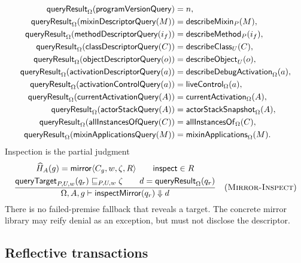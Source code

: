 \begin{equation}\label{eq:mirror-query-result}
\begin{aligned}
 \mathsf{queryResult}_{\Omega}(\mathsf{programVersionQuery})&=n,\\
 \mathsf{queryResult}_{\Omega}(\mathsf{mixinDescriptorQuery}(M))
   &=\mathsf{describeMixin}_{P}(M),\\
 \mathsf{queryResult}_{\Omega}(\mathsf{methodDescriptorQuery}(i_f))
   &=\mathsf{describeMethod}_{P}(i_f),\\
 \mathsf{queryResult}_{\Omega}(\mathsf{classDescriptorQuery}(C))
   &=\mathsf{describeClass}_{U}(C),\\
 \mathsf{queryResult}_{\Omega}(\mathsf{objectDescriptorQuery}(o))
   &=\mathsf{describeObject}_{U}(o),\\
 \mathsf{queryResult}_{\Omega}(\mathsf{activationDescriptorQuery}(a))
   &=\mathsf{describeDebugActivation}_{\Omega}(a),\\
 \mathsf{queryResult}_{\Omega}(\mathsf{activationControlQuery}(a))
   &=\mathsf{liveControl}_{\Omega}(a),\\
 \mathsf{queryResult}_{\Omega}(\mathsf{currentActivationQuery}(A))
   &=\mathsf{currentActivation}_{\Omega}(A),\\
 \mathsf{queryResult}_{\Omega}(\mathsf{actorStackQuery}(A))
   &=\mathsf{actorStackSnapshot}_{\Omega}(A),\\
 \mathsf{queryResult}_{\Omega}(\mathsf{allInstancesOfQuery}(C))
   &=\mathsf{allInstancesOf}_{\Omega}(C),\\
 \mathsf{queryResult}_{\Omega}(\mathsf{mixinApplicationsQuery}(M))
   &=\mathsf{mixinApplications}_{\Omega}(M).
\end{aligned}
\end{equation}
Inspection is the partial judgment
\[
\dfrac{\begin{gathered}
 \widehat H_A(g)=\mathsf{mirror}\langle C_g,w,\zeta,R\rangle\qquad
 \mathsf{inspect}\in R\\
 \mathsf{queryTarget}_{P,U,w}(q_r)
       \sqsubseteq_{P,U,w}\zeta\qquad
 d=\mathsf{queryResult}_{\Omega}(q_r)
\end{gathered}}
 {\Omega,A,g\vdash\mathsf{inspectMirror}(q_r)\Downarrow d}
\quad(\textsc{Mirror-Inspect})
\]
There is no failed-premise fallback that reveals a target.  The concrete
mirror library may reify denial as an exception, but must not disclose the
descriptor.

\subsection{Reflective transactions}

